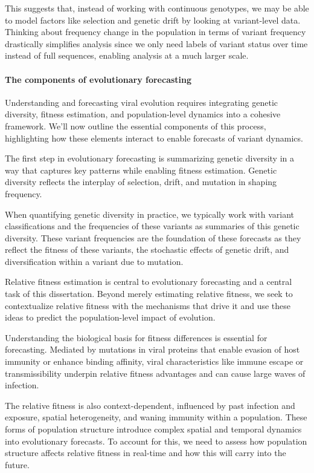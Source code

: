This suggests that, instead of working with continuous genotypes, we may be able to model factors like selection and genetic drift by looking at variant-level data.
Thinking about frequency change in the population in terms of variant frequency drastically simplifies analysis since we only need labels of variant status over time instead of full sequences, enabling analysis at a much larger scale.

\paragraph{The components of evolutionary forecasting}

Understanding and forecasting viral evolution requires integrating genetic diversity, fitness estimation, and population-level dynamics into a cohesive framework.
We'll now outline the essential components of this process, highlighting how these elements interact to enable forecasts of variant dynamics.

The first step in evolutionary forecasting is summarizing genetic diversity in a way that captures key patterns  while enabling fitness estimation.
Genetic diversity reflects the interplay of selection, drift, and mutation in shaping frequency.

When quantifying genetic diversity in practice, we typically work with variant classifications and the frequencies of these variants as summaries of this genetic diversity.
These variant frequencies are the foundation of these forecasts as they reflect the fitness of these variants, the stochastic effects of genetic drift, and diversification within a variant due to mutation.

Relative fitness estimation is central to evolutionary forecasting and a central task of this dissertation.
Beyond merely estimating relative fitness, we seek to contextualize relative fitness with the mechanisms that drive it and use these ideas to predict the population-level impact of evolution.

Understanding the biological basis for fitness differences is essential for forecasting.
Mediated by mutations in viral proteins that enable evasion of host immunity or enhance binding affinity, viral characteristics like immune escape or transmissibility underpin relative fitness advantages and can cause large waves of infection.

The relative fitness is also context-dependent, influenced by past infection and exposure, spatial heterogeneity, and waning immunity within a population.
These forms of population structure introduce complex spatial and temporal dynamics into evolutionary forecasts.
To account for this, we need to assess how population structure affects relative fitness in real-time and how this will carry into the future.

